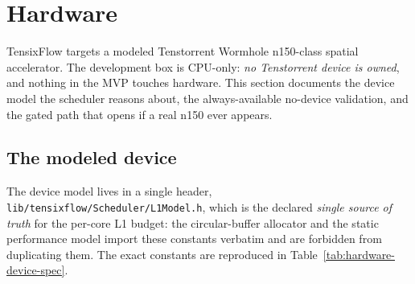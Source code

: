 \section{Hardware}\label{sec:hardware}

TensixFlow targets a modeled Tenstorrent Wormhole n150-class spatial
accelerator. The development box is CPU-only: \emph{no Tenstorrent device is
owned}, and nothing in the MVP touches hardware. This section documents the
device model the scheduler reasons about, the always-available no-device
validation, and the gated path that opens if a real n150 ever appears.

\subsection{The modeled device}

The device model lives in a single header,
\texttt{lib/tensixflow/Scheduler/L1Model.h}, which is the declared
\emph{single source of truth} for the per-core L1 budget: the circular-buffer
allocator and the static performance model import these constants verbatim
and are forbidden from duplicating them. The exact constants are reproduced
in Table~\ref{tab:hardware-device-spec}.

